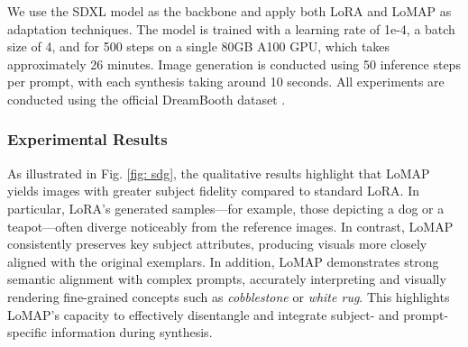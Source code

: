 We use the SDXL model \cite{podell2023sdxl} as the backbone and apply both LoRA and LoMAP as adaptation techniques. 
The model is trained with a learning rate of 1e-4, a batch size of 4, and for 500 steps on a single 80GB A100 GPU, which takes approximately 26 minutes. 
Image generation is conducted using 50 inference steps per prompt, with each synthesis taking around 10 seconds.
All experiments are conducted using the official DreamBooth dataset \cite{ruiz2023dreambooth}.








\subsubsection{Experimental Results}


As illustrated in Fig. \ref{fig: sdg}, the qualitative results highlight that LoMAP yields images with greater subject fidelity compared to standard LoRA. 
In particular, LoRA’s generated samples—for example, those depicting a dog or a teapot—often diverge noticeably from the reference images.
In contrast, LoMAP consistently preserves key subject attributes, producing visuals more closely aligned with the original exemplars.
In addition, LoMAP demonstrates strong semantic alignment with complex prompts, accurately interpreting and visually rendering fine-grained concepts such as \textit{cobblestone} or \textit{white rug}.
This highlights LoMAP’s capacity to effectively disentangle and integrate subject- and prompt-specific information during synthesis.
